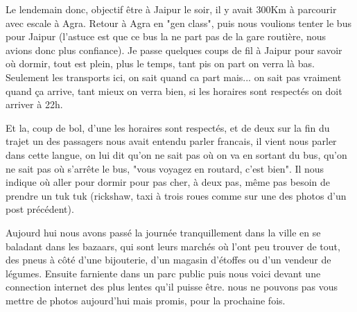 \begin{multicols}{2}
Le lendemain donc, objectif être à Jaipur le soir, il y avait 300Km à parcourir avec escale à Agra. Retour à Agra en "gen class", puis nous voulions tenter le bus pour Jaipur (l'astuce est que ce bus la ne part pas de la gare routière, nous avions donc plus confiance). Je passe quelques coups de fil à Jaipur pour savoir où dormir, tout est plein, plus le temps, tant pis on part on verra là bas. Seulement les transports ici, on sait quand ca part mais... on sait pas vraiment quand ça arrive, tant mieux on verra bien, si les horaires sont respectés on doit arriver à 22h.

Et la, coup de bol, d'une les horaires sont respectés, et de deux sur la fin du trajet un des passagers nous avait entendu parler francais, il vient nous parler dans cette langue, on lui dit qu'on ne sait pas où on va en sortant du bus, qu'on ne sait pas où s'arrête le bus, "vous voyagez en routard, c'est bien". Il nous indique où aller pour dormir pour pas cher, à deux pas, même pas besoin de prendre un tuk tuk (rickshaw, taxi à trois roues comme sur une des photos d'un post précédent).

Aujourd hui nous avons passé la journée tranquillement dans la ville en se baladant dans les bazaars, qui sont leurs marchés où l'ont peu trouver de tout, des pneus à côté d'une bijouterie, d'un magasin d'étoffes ou d'un vendeur de légumes. Ensuite farniente dans un parc public puis nous voici devant une connection internet des plus lentes qu'il puisse être. nous ne pouvons pas vous mettre de photos aujourd'hui mais promis, pour la prochaine fois.

\end{multicols}


